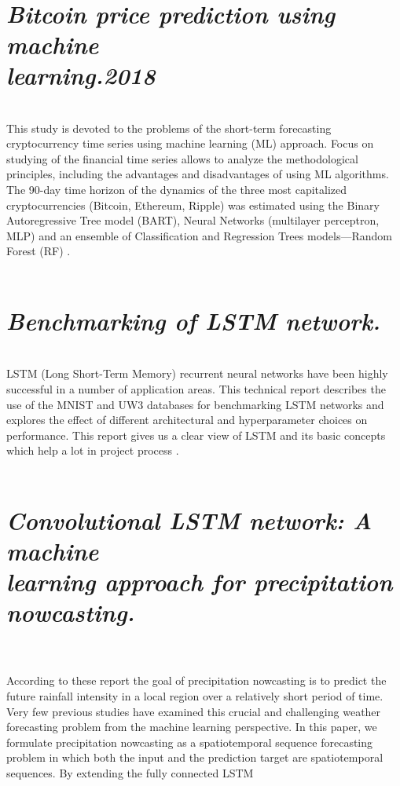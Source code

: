\documentclass[openany,12pt]{report}
\begin{document}
\\
\section{{\textit{Bitcoin price prediction using machine\\learning.2018}} }
\\This study is devoted to the problems of the short-term forecasting cryptocurrency time series using machine learning (ML) approach. Focus on studying of
the financial time series allows to analyze the methodological principles, including
the advantages and disadvantages of using ML algorithms. The 90-day time horizon
of the dynamics of the three most capitalized cryptocurrencies (Bitcoin, Ethereum,
Ripple) was estimated using the Binary Autoregressive Tree model (BART), Neural Networks (multilayer perceptron, MLP) and an ensemble of Classification and
Regression Trees models—Random Forest (RF) \cite{paper4}.\\
\\
\section{{\textit{Benchmarking of LSTM network.}}}\\
LSTM (Long Short-Term Memory) recurrent neural networks have been highly successful in a number of application areas. This technical report describes the use of the MNIST and UW3 databases for benchmarking LSTM networks and explores the effect of different architectural and
hyperparameter choices on performance. 
This report gives us a clear view of LSTM and its basic concepts which help a lot in project process \cite{paper7}.\\
\\
\section{\textit{Convolutional LSTM network: A machine\\ learning approach for precipitation nowcasting.}}\\
\\According to these report the goal of precipitation nowcasting is to predict the future rainfall intensity in a local region over a relatively short period of time. Very few previous studies have
examined this crucial and challenging weather forecasting problem from the machine learning perspective. In this paper, we formulate precipitation nowcasting as a spatiotemporal sequence forecasting problem in which both the input and the
prediction target are spatiotemporal sequences. By extending the fully connected LSTM 
\end{document}
